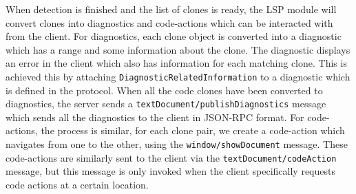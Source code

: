 When detection is finished and the list of clones is ready, the LSP module will convert
clones into diagnostics and code-actions which can be interacted with from the client. For
diagnostics, each clone object is converted into a diagnostic which has a range and some
information about the clone. The diagnostic displays an error in the client which also has
information for each matching clone. This is achieved this by attaching
\verb|DiagnosticRelatedInformation| to a diagnostic which is defined in the protocol. When
all the code clones have been converted to diagnostics, the server sends a
\verb|textDocument/publishDiagnostics| message which sends all the diagnostics to the
client in JSON-RPC format. For code-actions, the process is similar, for each clone pair,
we create a code-action which navigates from one to the other, using the
\verb|window/showDocument| message. These code-actions are similarly sent to the client
via the \verb|textDocument/codeAction| message, but this message is only invoked when the
client specifically requests code actions at a certain location.

